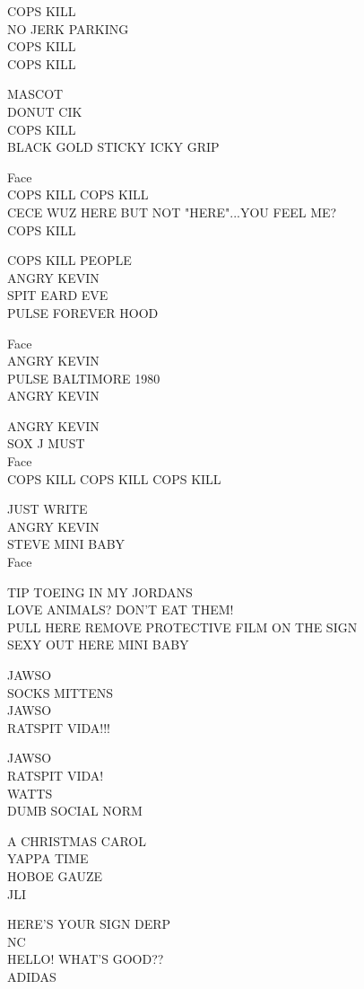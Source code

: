 \documentclass[10pt,letterpaper]{article}
\begin{document}
COPS KILL\\
NO JERK PARKING\\
COPS KILL\\
COPS KILL

MASCOT\\
DONUT CIK\\
COPS KILL\\
BLACK GOLD STICKY ICKY GRIP

Face\\
COPS KILL COPS KILL\\
CECE WUZ HERE BUT NOT "HERE"...YOU FEEL ME?\\
COPS KILL

COPS KILL PEOPLE\\
ANGRY KEVIN\\
SPIT EARD EVE\\
PULSE FOREVER HOOD

Face\\
ANGRY KEVIN\\
PULSE BALTIMORE 1980\\
ANGRY KEVIN

ANGRY KEVIN\\
SOX J MUST\\
Face\\
COPS KILL COPS KILL COPS KILL

JUST WRITE\\
ANGRY KEVIN\\
STEVE MINI BABY\\
Face

TIP TOEING IN MY JORDANS\\
LOVE ANIMALS?  DON'T EAT THEM!\\
PULL HERE REMOVE PROTECTIVE FILM ON THE SIGN\\
SEXY OUT HERE MINI BABY

JAWSO\\
SOCKS MITTENS\\
JAWSO\\
RATSPIT VIDA!!!

JAWSO\\
RATSPIT VIDA!\\
WATTS\\
DUMB SOCIAL NORM

A CHRISTMAS CAROL\\
YAPPA TIME\\
HOBOE GAUZE\\
JLI

HERE'S YOUR SIGN DERP\\
NC\\
HELLO!  WHAT'S GOOD??\\
ADIDAS
\end{document}
